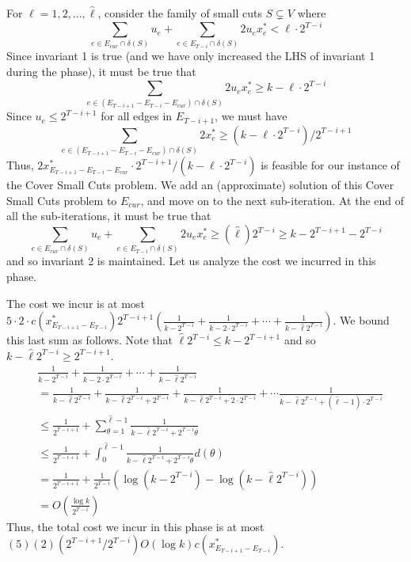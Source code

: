 \documentclass[11pt]{article}
\newcommand{\alphatwo}{2}
\begin{document}
{For $\ell = 1,2,\ldots, \hat{\ell}$, consider the family of small cuts $S \subsetneq V$ where
\[
\sum_{e\in E_{cur} \cap \delta(S)}u_e + \sum_{e\in E_{T-i} \cap \delta(S)} \alphatwo u_ex^*_e < \ell\cdot 2^{T-i} \tag{definition of small cuts}
\]
Since invariant 1 is true (and we have only increased the LHS of
invariant 1 during the phase), it must be true that
\[
\sum_{e\in (E_{T-i+1}-E_{T-i}-E_{cur}) \cap \delta(S)}\alphatwo  u_ex^*_e \geq k-\ell\cdot 2^{T-i}
\]
Since $u_e \leq 2^{T-i+1}$ for all edges in $E_{T-i+1}$, we must have
\[
\sum_{e\in (E_{T-i+1}-E_{T-i}-E_{cur}) \cap \delta(S)}\alphatwo  x^*_e \geq (k-\ell\cdot 2^{T-i})/2^{T-i+1}
\]
Thus, $\alphatwo x^*_{E_{T-i+1}-E_{T-i}-E_{cur}} \cdot 2^{T-i+1}/(k-\ell\cdot
2^{T-i})$ is feasible for our instance of the Cover Small Cuts problem. We add
an (approximate) solution of this Cover Small Cuts problem to
$E_{cur}$, and move on to the next sub-iteration. At the end of all
the sub-iterations, it must be true that
\[
    \sum_{e\in E_{cur} \cap \delta(S)}u_e + \sum_{e\in E_{T-i} \cap \delta(S)}\alphatwo u_ex^*_e \geq (\hat{\ell})2^{T-i} \geq k-2^{T-i+1}-2^{T-i}
\]
and so invariant 2 is maintained. Let us analyze the cost we incurred in this phase.

The cost we incur is at most $5 \cdot \alphatwo \cdot  c(x^*_{E_{T-i+1}-E_{T-i}})2^{T-i+1}
(\frac{1}{k-2^{T-i}} + \frac{1}{k-2\cdot2^{T-i}} +
\cdots+\frac{1}{k-\hat{\ell}2^{T-i}})$. We bound this last sum as
follows. Note that $\hat{\ell} 2^{T-i} \leq k - 2^{T-i+1}$ and so
$k-\hat{\ell}2^{T-i} \geq 2^{T-i+1}$.
\begin{align*}
    &\frac{1}{k-2^{T-i}} + \frac{1}{k-2\cdot2^{T-i}} + \cdots+\frac{1}{k-\hat{\ell}2^{T-i}} \\
    &= \frac{1}{k-\hat{\ell}2^{T-i}} + \frac{1}{k-\hat{\ell}2^{T-i} + 2^{T-i}}+ \frac{1}{k-\hat{\ell}2^{T-i} + 2\cdot 2^{T-i}} + \cdots \frac{1}{k-\hat{\ell}2^{T-i} + (\hat{\ell}-1)\cdot 2^{T-i}}\\
    &\leq \frac{1}{2^{T-i+1}} + \sum_{\theta = 1}^{\hat{\ell}-1} \frac{1}{k-\hat{\ell}2^{T-i} + 2^{T-i}\theta}\\
    &\leq \frac{1}{2^{T-i+1}} + \int_0^{\hat{\ell}-1} \frac{1}{k-\hat{\ell}2^{T-i} + 2^{T-i}\theta} d(\theta)\\
    & = \frac{1}{2^{T-i+1}}+ \frac{1}{2^{T-i}}\left(\log(k-2^{T-i}) - \log(k-\hat{\ell}2^{T-i})\right)\\
    & = O(\frac{\log k}{2^{T-i}})
\end{align*}
Thus, the total cost we incur in this phase is at most
$(5)(\alphatwo) (2^{T-i+1}/2^{T-i})O(\log k) c(x^*_{E_{T-i+1}-E_{T-i}})$.

}
\end{document}
